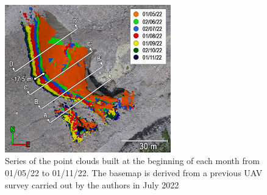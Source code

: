 \begin{figure}
  \centering
  \includegraphics[width=72mm]{4_sec_location.png}
  \caption{Series of the point clouds built at the beginning of each month from
    01/05/22 to 01/11/22. The basemap is derived from a previous UAV survey carried out by the authors in July 2022}
  \label{fig:4:section_locations}
\end{figure}

